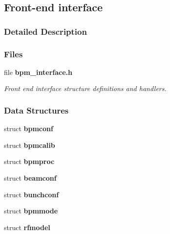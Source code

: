 \subsection{Front-end interface}
\label{group__interface}


\subsubsection{Detailed Description}


\subsubsection*{Files}
\begin{CompactItemize}
\item 
file {\bf bpm\_\-interface.h}
\begin{CompactList}\small\item\em Front end interface structure definitions and handlers. \item\end{CompactList}

\end{CompactItemize}
\subsubsection*{Data Structures}
\begin{CompactItemize}
\item 
struct {\bf bpmconf}
\item 
struct {\bf bpmcalib}
\item 
struct {\bf bpmproc}
\item 
struct {\bf beamconf}
\item 
struct {\bf bunchconf}
\item 
struct {\bf bpmmode}
\item 
struct {\bf rfmodel}
\end{CompactItemize}
